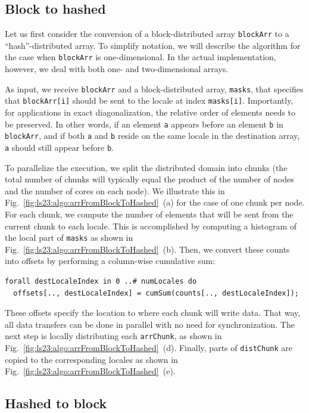 \subsection{Block to hashed}

Let us first consider the conversion of a block-distributed array \verb|blockArr| to a ``hash''-distributed array. To simplify notation, we will describe the algorithm for the case when \verb|blockArr| is one-dimensional. In the actual implementation, however, we deal with both one- and two-dimensional arrays.

As input, we receive \verb|blockArr| and a block-distributed array, \verb|masks|, that specifies that \verb|blockArr[i]| should be sent to the locale at index \verb|masks[i]|. Importantly, for applications in exact diagonalization, the relative order of elements needs to be preserved. In other words, if an element \verb|a| appears before an element \verb|b| in \verb|blockArr|, and if both \verb|a| and \verb|b| reside on the same locale in the destination array, \verb|a| should still appear before \verb|b|.

To parallelize the execution, we split the distributed domain into chunks (the total number of chunks will typically equal the product of the number of nodes and the number of cores on each node). We illustrate this in Fig.~\ref{fig:ls23:algo:arrFromBlockToHashed}~(a) for the case of one chunk per node. For each chunk, we compute the number of elements that will be sent from the current chunk to each locale. This is accomplished by computing a histogram of the local part of \verb|masks| as shown in Fig.~\ref{fig:ls23:algo:arrFromBlockToHashed}~(b). Then, we convert these counts into offsets by performing a column-wise cumulative sum:
\vspace{-0.1cm}
\begin{verbatim}
forall destLocaleIndex in 0 ..# numLocales do
  offsets[.., destLocaleIndex] = cumSum(counts[.., destLocaleIndex]);
\end{verbatim}
\vspace{-0.2cm}
These offsets specify the location to where each chunk will write data. That way, all data transfers can be done in parallel with no need for synchronization. The next step is locally distributing each \verb|arrChunk|, as shown in Fig.~\ref{fig:ls23:algo:arrFromBlockToHashed}~(d). Finally, parts of \verb|distChunk| are copied to the corresponding locales as shown in Fig.~\ref{fig:ls23:algo:arrFromBlockToHashed}~(e).

\subsection{Hashed to block}

